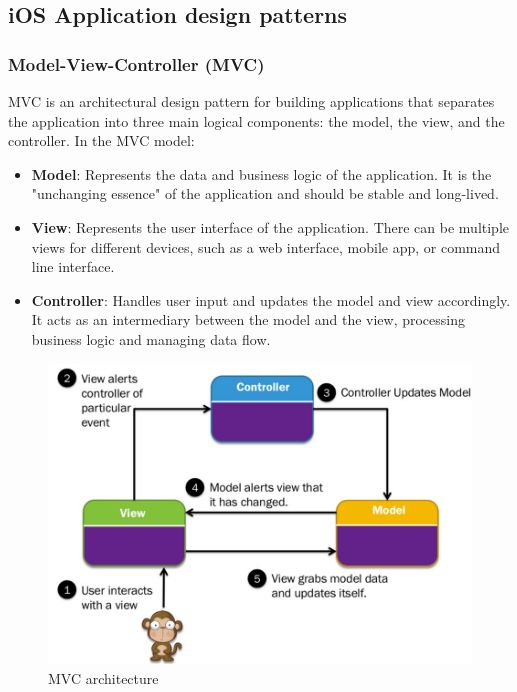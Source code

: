 \subsection{iOS Application design patterns}

\subsubsection{Model-View-Controller (MVC)}

MVC is an architectural design pattern for building applications that separates the application into three main logical components: the model, the view, and the controller. In the MVC model:

\begin{itemize}
    \item \textbf{Model}: Represents the data and business logic of the application. It is the "unchanging essence" of the application and should be stable and long-lived.

    \item \textbf{View}: Represents the user interface of the application. There can be multiple views for different devices, such as a web interface, mobile app, or command line interface.

    \item \textbf{Controller}: Handles user input and updates the model and view accordingly. It acts as an intermediary between the model and the view, processing business logic and managing data flow.
\end{itemize}

\begin{figure}[H]
    \centering
    \includegraphics[width=\textwidth]{assets/images/Research/System/MVC.png}
    \caption{MVC architecture}
    \label{fig:mvc}
\end{figure}

